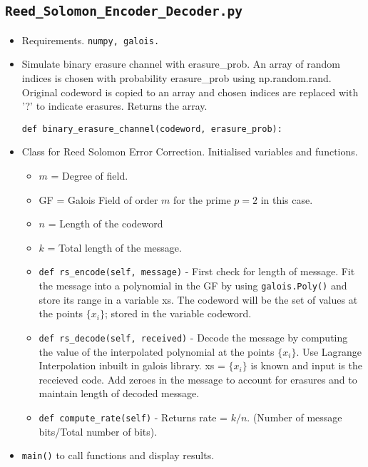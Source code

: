 \documentclass{scrartcl}
\begin{document}
\newpage
\subsection{\texttt{Reed\_Solomon\_Encoder\_Decoder.py}}
\begin{itemize}
\item Requirements. \texttt{numpy, galois.}
\item Simulate binary erasure channel with erasure\_prob. An array of random indices is chosen with probability erasure\_prob using np.random.rand. Original codeword is copied to an array and chosen indices are replaced with '?' to indicate erasures. Returns the array.
\begin{verbatim}
def binary_erasure_channel(codeword, erasure_prob):
\end{verbatim}

\item Class for Reed Solomon Error Correction. Initialised variables and functions.
\begin{itemize}
    \item $m$ = Degree of field.
    \item GF = Galois Field of order $m$ for the prime $p = 2$ in this case.
    \item $n$ = Length of the codeword
    \item $k$ = Total length of the message.

    \item \texttt{def rs\_encode(self, message)} - First check for length of message. Fit the message into a polynomial in the GF by using \texttt{galois.Poly()} and store its range in a variable xs. The codeword will be the set of values at the points $\{ x_i \}$; stored in the variable codeword.

    \item \texttt{def rs\_decode(self, received)} - Decode the message by computing the value of the interpolated polynomial at the points $\{ x_i \}.$ Use Lagrange Interpolation inbuilt in galois library. xs = $\{x_i\}$ is known and input is the receieved code. Add zeroes in the message to account for erasures and to maintain length of decoded message.

    \item \texttt{def compute\_rate(self)} - Returns rate = $k/n.$ (Number of message bits/Total number of bits).
\end{itemize}

\item \texttt{main()} to call functions and display results.

\end{itemize}
\end{document}
